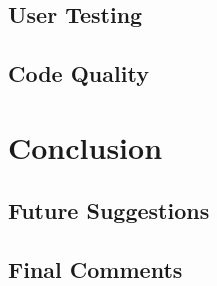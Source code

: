 \documentclass[msc,deptreport, cs]{infthesis}
\begin{document}
\section{User Testing}

\section{Code Quality}

\chapter{Conclusion}

\section{Future Suggestions} 


\section{Final Comments}



\end{document}
